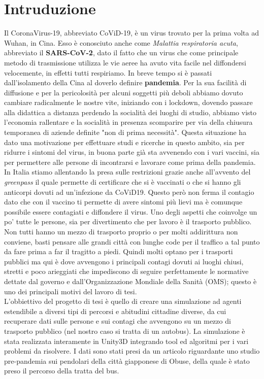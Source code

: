 \documentclass[12pt]{book}
\begin{document}
	\chapter*{Intruduzione}	
		Il CoronaVirus-19, abbreviato CoViD-19, è un virus trovato per la prima volta ad Wuhan, in Cina. Esso è conosciuto anche come \emph{Malattia respiratoria acuta}, abbreviato il \textbf{SARS-CoV-2}, dato il fatto che un virus che come principale metodo di trasmissione utilizza le vie aeree ha avuto vita facile nel diffondersi velocemente, in effetti tutti respiriamo. In breve tempo si è passati dall'isolamento della Cina al doverlo definire \textbf{pandemia}.
		Per la sua facilità di diffusione e per la pericolosità per alcuni soggetti più deboli abbiamo dovuto cambiare radicalmente le nostre vite, iniziando con i lockdown, dovendo passare alla didattica a distanza perdendo la socialità dei luoghi di studio, abbiamo visto l'economia rallentare e la socialità in presenza scomparire per via della chiusura temporanea di aziende definite "non di prima necessità".
		Questa situazione ha dato una motivazione per effettuare studi e ricerche in questo ambito, sia per ridurre i sintomi del virus, in buona parte già sta avvenendo con i vari vaccini, sia per permettere alle persone di incontrarsi e lavorare come prima della pandemia. In Italia stiamo allentando la presa sulle restrizioni grazie anche all'avvento del \emph{greenpass} il quale permette di certificare che si è vaccinati o che si hanno gli anticorpi dovuti ad un'infezione da CoViD19. Questo però non ferma il contagio dato che con il vaccino ti permette di avere sintomi più lievi ma è comunque possibile essere contagiati e diffondere il virus. 
		Uno degli aspetti che coinvolge un po' tutte le persone, sia per divertimento che per lavoro è il trasporto pubblico. Non tutti hanno un mezzo di trasporto proprio o per molti addirittura non conviene, basti pensare alle grandi città con lunghe code per il traffico a tal punto da fare prima a far il tragitto a piedi. Quindi molti optano per i trasporti pubblici ma qui è dove avvengono i principali contagi dovuti ai luoghi chiusi, stretti e poco arieggiati che impediscono di seguire perfettamente le normative dettate dal governo e dall'Organizzazione Mondiale della Sanità (OMS); questo è uno dei principali motivi del lavoro di tesi.\\
		L'obbiettivo del progetto di tesi è quello di creare una simulazione ad agenti estendibile a diversi tipi di percorsi e abitudini cittadine diverse, da cui recuperare dati sulle persone e sui contagi che avvengono su un mezzo di trasporto pubblico (nel nostro caso si tratta di un autobus). La simulazione è stata realizzata interamente in Unity3D integrando tool ed algoritmi per i vari problemi da risolvere. I dati sono stati presi da un articolo riguardante uno studio pre-pandemia sui pendolari della città giapponese di Obuse, della quale è stato preso il percorso della tratta del bus.
\end{document}
